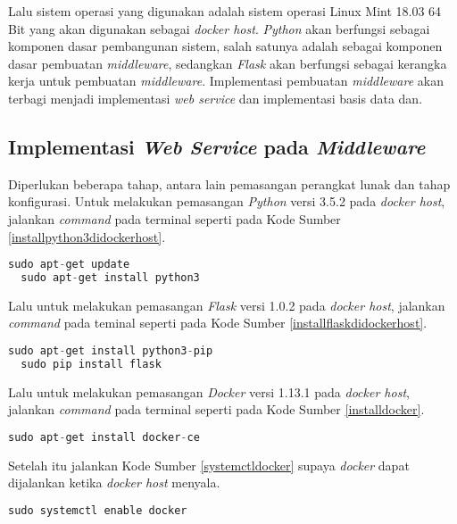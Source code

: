   Lalu sistem operasi yang digunakan adalah sistem operasi Linux Mint 18.03 64 Bit yang akan digunakan sebagai \textit{docker host}. \textit{Python} akan berfungsi sebagai komponen dasar pembangunan sistem, salah satunya adalah sebagai komponen dasar pembuatan \textit{middleware}, sedangkan \textit{Flask} akan berfungsi sebagai kerangka kerja untuk pembuatan \textit{middleware}. Implementasi pembuatan \textit{middleware} akan terbagi menjadi implementasi \textit{web service} dan implementasi basis data dan.
  
  \subsection{Implementasi \textit{Web Service} pada \textit{Middleware}}
  Diperlukan beberapa tahap, antara lain pemasangan perangkat lunak dan tahap konfigurasi. Untuk melakukan pemasangan \textit{Python} versi 3.5.2 pada \textit{docker host}, jalankan \textit{command} pada terminal seperti pada Kode Sumber \ref{installpython3didockerhost}.\\
  \begin{minipage}{\linewidth}
  \begin{lstlisting}[caption=Command untuk installasi Python,language=Python,label=installpython3didockerhost]
  sudo apt-get update
  sudo apt-get install python3
  \end{lstlisting}
  \end{minipage}
  
  Lalu untuk melakukan pemasangan \textit{Flask} versi 1.0.2 pada \textit{docker host}, jalankan \textit{command} pada teminal seperti pada Kode Sumber \ref{installflaskdidockerhost}.\\  
  \begin{minipage}{\linewidth}
  \begin{lstlisting}[caption=Command untuk installasi Flask,language=Python,label=installflaskdidockerhost]
  sudo apt-get install python3-pip
  sudo pip install flask
  \end{lstlisting}
  \end{minipage} 
  
  Lalu untuk melakukan pemasangan \textit{Docker} versi 1.13.1 pada \textit{docker host}, jalankan \textit{command} pada terminal seperti pada Kode Sumber \ref{installdocker}.\\
  \begin{minipage}{\linewidth}
  \begin{lstlisting}[caption=Command untuk installasi Flask,language=Python,label=installdocker]
  sudo apt-get install docker-ce
  \end{lstlisting}
  \end{minipage} 
  Setelah itu jalankan Kode Sumber \ref{systemctldocker} supaya \textit{docker} dapat dijalankan ketika \textit{docker host} menyala.\\
  \begin{minipage}{\linewidth}
  \begin{lstlisting}[caption=Command untuk installasi Flask,language=Python,label=systemctldocker]
  sudo systemctl enable docker
  \end{lstlisting}
  \end{minipage} 


